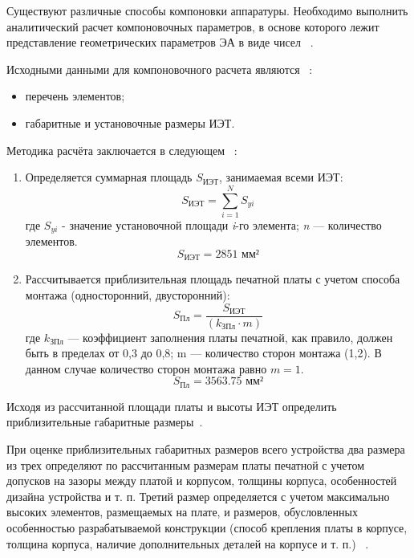 Существуют различные способы компоновки аппаратуры.
Необходимо выполнить аналитический расчет компоновочных параметров,
в основе которого лежит представление геометрических параметров ЭА
в виде чисел ~\cite{Kostukevich2012}.

Исходными данными для компоновочного расчета являются
~\cite{Kostukevich2012}:
\begin{itemize}
\item перечень элементов;  
\item габаритные и установочные размеры ИЭТ.
\end{itemize}

Методика расчёта заключается в следующем ~\cite{Kostukevich2012}:
\begin{enumerate}
\item Определяется суммарная площадь $S_{\text{ИЭТ}}$, занимаемая всеми ИЭТ:
  \begin{equation}
    S_{\text{ИЭТ}} = \sum^N_{i=1}S_{yi}
  \end{equation}
  где $S_{yi}$ - значение установочной площади \textit{i}-го элемента;
  \textit{n} —  количество элементов.
%
  $$ S_{\text{ИЭТ}}= 2851 \text{ мм²}$$
%
\item Рассчитывается приблизительная площадь печатной платы с учетом
  способа монтажа (односторонний, двусторонний):
  \begin{equation}
    S_{\text{Пл}} = \frac{S_{\text{ИЭТ}}}{(k_{\text{ЗПл}} \cdot m)}
  \end{equation}
  где $k_{\text{ЗПл}}$ — коэффициент заполнения платы печатной, как правило,
  должен быть в пределах от 0,3 до 0,8;
  m — количество сторон монтажа (1,2).
  В данном случае количество сторон монтажа равно $m=1$.
  $$S_{\text{Пл}} = 3563.75 \text{ мм²}$$
\end{enumerate}


Исходя из рассчитанной площади платы и высоты ИЭТ определить
приблизительные габаритные размеры~\cite{Kostukevich2012}.

При оценке приблизительных габаритных размеров всего устройства два
размера из трех определяют по рассчитанным размерам платы печатной с
учетом допусков на зазоры между платой и корпусом, толщины корпуса,
особенностей дизайна устройства и т. п.
Третий размер определяется с учетом максимально высоких элементов,
размещаемых на плате, и размеров, обусловленных особенностью
разрабатываемой конструкции (способ крепления платы в корпусе,
толщина корпуса, наличие дополнительных деталей на корпусе и т. п.) ~\cite{Kostukevich2012}.

